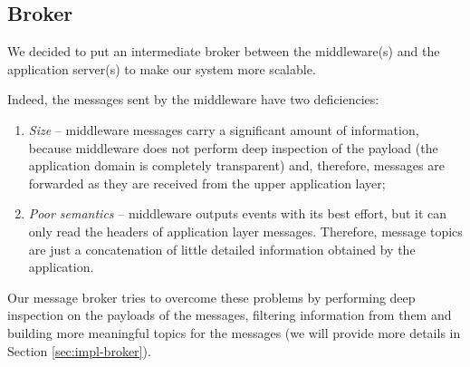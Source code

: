 \subsection{Broker}

We decided to put an intermediate broker between the middleware(s) and the
application server(s) to make our system more scalable.

Indeed, the messages sent by the middleware have two deficiencies:

\begin{enumerate}
  \item \textit{Size} -- middleware messages carry a significant amount of
    information, because middleware does not perform deep inspection of the
    payload (the application domain is completely transparent) and, therefore,
    messages are forwarded as they are received from the upper application
    layer;
  \item \textit{Poor semantics} -- middleware outputs events with its best
    effort, but it can only read the headers of application layer messages.
    Therefore, message topics are just a concatenation of little detailed
    information obtained by the application.
\end{enumerate}

Our message broker tries to overcome these problems by performing deep
inspection on the payloads of the messages, filtering information from them and
building more meaningful topics for the messages (we will provide more details
in Section \ref{sec:impl-broker}).
